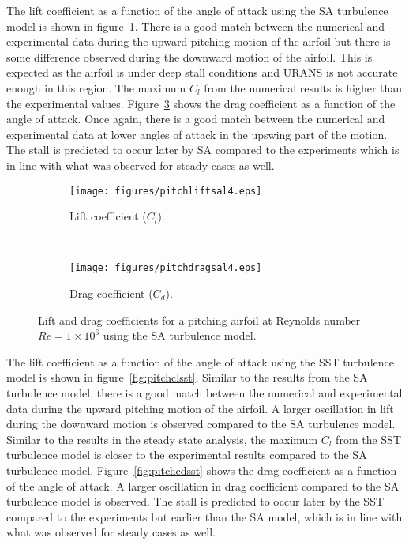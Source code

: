 The lift coefficient as a function of the angle of attack using the SA turbulence model is shown in figure~\ref{fig:pitchclsa}. There is a good match between the numerical and experimental data during the upward pitching motion of the airfoil but there is some difference observed during the downward motion of the airfoil. This is expected as the airfoil is under deep stall conditions and URANS is not accurate enough in this region. The maximum $C_l$ from the numerical results is higher than the experimental values. Figure~\ref{fig:pitchcdsa} shows the drag coefficient as a function of the angle of attack. Once again, there is a good match between the numerical and experimental data at lower angles of attack in the upswing part of the motion. The stall is predicted to occur later by SA compared to the experiments which is in line with what was observed for steady cases as well. 
\begin{figure}[h!]
    \centering
    \captionsetup{justification=centering}
    \begin{subfigure}[b]{0.48\textwidth}
    \captionsetup{justification=centering}
        \texttt{[image: figures/pitchliftsal4.eps]}    
    \caption{Lift coefficient ($C_l$).}
    \label{fig:pitchclsa}
    \end{subfigure}
    ~ %
    \begin{subfigure}[b]{0.48\textwidth}
    \centering
    \captionsetup{justification=centering}
        \texttt{[image: figures/pitchdragsal4.eps]}
        \caption{Drag coefficient ($C_d$).}
    \label{fig:pitchcdsa}
    \end{subfigure}
    \caption{Lift and drag coefficients for a pitching airfoil at Reynolds number $Re=1\times10^6$ using the SA turbulence model.}
\end{figure}
The lift coefficient as a function of the angle of attack using the SST turbulence model is shown in figure~\ref{fig:pitchclsst}. Similar to the results from the SA turbulence model, there is a good match between the numerical and experimental data during the upward pitching motion of the airfoil. A larger oscillation in lift during the downward motion is observed compared to the SA turbulence model. Similar to the results in the steady state analysis, the maximum $C_l$ from the SST turbulence model is closer to the experimental results compared to the SA turbulence model. Figure~\ref{fig:pitchcdsst} shows the drag coefficient as a function of the angle of attack. A larger oscillation in drag coefficient compared to the SA turbulence model is observed. The stall is predicted to occur later by the SST compared to the experiments but earlier than the SA model, which is in line with what was observed for steady cases as well. 
